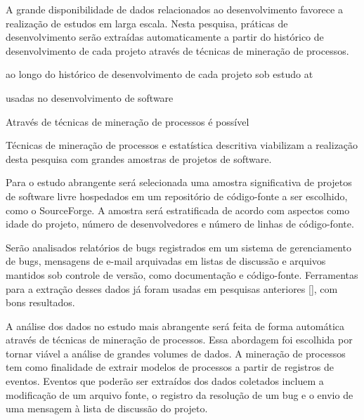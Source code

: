 \documentclass{article}
\begin{document}
A grande disponibilidade de dados relacionados ao desenvolvimento favorece a
realização de estudos em larga escala. Nesta pesquisa, práticas de
desenvolvimento serão extraídas automaticamente a partir do histórico de
desenvolvimento de cada projeto através de técnicas de mineração de processos.

ao longo do histórico de
desenvolvimento de cada projeto sob estudo at


usadas no desenvolvimento de software

Através de
técnicas de mineração de processos é possível 



Técnicas de mineração de processos e estatística descritiva
viabilizam a realização desta pesquisa com grandes amostras de projetos de
software.

Para o estudo abrangente será selecionada uma amostra significativa de projetos
de software livre hospedados em um repositório de código-fonte a ser escolhido,
como o SourceForge. A amostra será estratificada de acordo com aspectos como
idade do projeto, número de desenvolvedores e número de linhas de código-fonte.

Serão analisados relatórios de bugs registrados em um sistema de gerenciamento
de bugs, mensagens de e-mail arquivadas em listas de discussão e arquivos
mantidos sob controle de versão, como documentação e código-fonte. Ferramentas
para a extração desses dados já foram usadas em pesquisas anteriores [], com
bons resultados.

A análise dos dados no estudo mais abrangente será feita de forma automática
através de técnicas de mineração de processos. Essa abordagem foi escolhida por
tornar viável a análise de grandes volumes de dados. A mineração de processos
tem como finalidade de extrair modelos de processos a partir de registros de
eventos. Eventos que poderão ser extraídos dos dados coletados incluem a
modificação de um arquivo fonte, o registro da resolução de um bug e o envio de
uma mensagem à lista de discussão do projeto.

\end{document}
